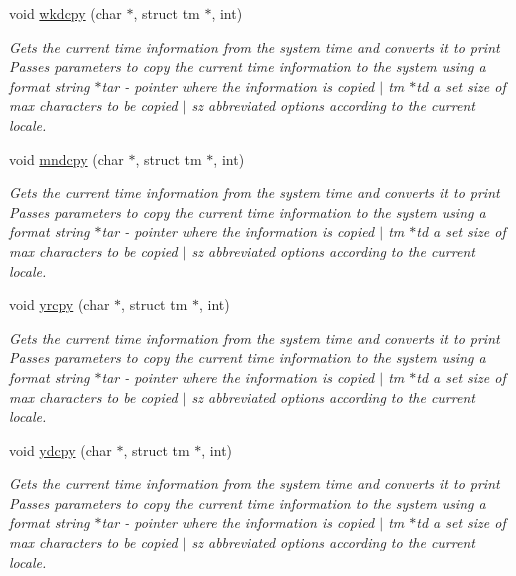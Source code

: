 \begin{DoxyCompactItemize}
void \mbox{\hyperlink{class_time_date_widget_a246faf35eac50b09e6abcce4e7be05bb}{wkdcpy}} (char $\ast$, struct tm $\ast$, int)
\begin{DoxyCompactList}\small\item\em Gets the current time information from the system time and converts it to print  Passes parameters to copy the current time information to the system using a format string  $\ast$tar -\/ pointer where the information is copied $\vert$ tm $\ast$td a set size of max characters to be copied $\vert$ sz abbreviated options according to the current locale. \end{DoxyCompactList}\item 
void \mbox{\hyperlink{class_time_date_widget_a437ad9c3d801f50692798ffffad08297}{mndcpy}} (char $\ast$, struct tm $\ast$, int)
\begin{DoxyCompactList}\small\item\em Gets the current time information from the system time and converts it to print  Passes parameters to copy the current time information to the system using a format string  $\ast$tar -\/ pointer where the information is copied $\vert$ tm $\ast$td a set size of max characters to be copied $\vert$ sz abbreviated options according to the current locale. \end{DoxyCompactList}\item 
void \mbox{\hyperlink{class_time_date_widget_aa7cfe9f3a2a54c339e1504a31f8eecc6}{yrcpy}} (char $\ast$, struct tm $\ast$, int)
\begin{DoxyCompactList}\small\item\em Gets the current time information from the system time and converts it to print  Passes parameters to copy the current time information to the system using a format string  $\ast$tar -\/ pointer where the information is copied $\vert$ tm $\ast$td a set size of max characters to be copied $\vert$ sz abbreviated options according to the current locale. \end{DoxyCompactList}\item 
void \mbox{\hyperlink{class_time_date_widget_afce189c830553f6da526d5090849c6f4}{ydcpy}} (char $\ast$, struct tm $\ast$, int)
\begin{DoxyCompactList}\small\item\em Gets the current time information from the system time and converts it to print  Passes parameters to copy the current time information to the system using a format string  $\ast$tar -\/ pointer where the information is copied $\vert$ tm $\ast$td a set size of max characters to be copied $\vert$ sz abbreviated options according to the current locale. \end{DoxyCompactList}\item 

\end{DoxyCompactItemize}
